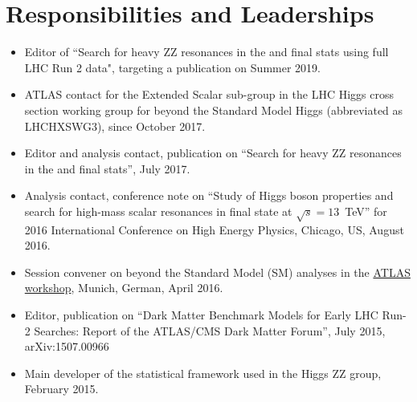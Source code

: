 \section*{Responsibilities and Leaderships}
\begin{itemize}
    \item Editor of ``Search for heavy ZZ resonances in the \llll and \llvv final stats using full LHC Run 2 data", targeting a publication on Summer 2019.

    \item ATLAS contact for the Extended Scalar sub-group in the LHC Higgs cross section working group for beyond the Standard Model Higgs (abbreviated as LHCHXSWG3), since October 2017.

    \item Editor and analysis contact, publication on ``Search for heavy ZZ resonances in the \llll and \llvv final stats'', July 2017.

    \item Analysis contact, conference note on ``Study of Higgs boson properties and search for high-mass scalar resonances in \llll final state at $\sqrt{s} = 13$~TeV'' for 2016 International Conference on High Energy Physics, Chicago, US, August 2016.

    \item Session convener on beyond the Standard Model (SM) analyses in the \href{https://indico.cern.ch/event/481860/}{ATLAS \HZZ workshop}, Munich, German, April 2016.

    \item Editor, publication on ``Dark Matter Benchmark Models for Early LHC Run-2 Searches: Report of the ATLAS/CMS Dark Matter Forum'', July 2015, arXiv:1507.00966

    \item Main developer of the statistical framework used in the Higgs ZZ group, February 2015.

\end{itemize}
